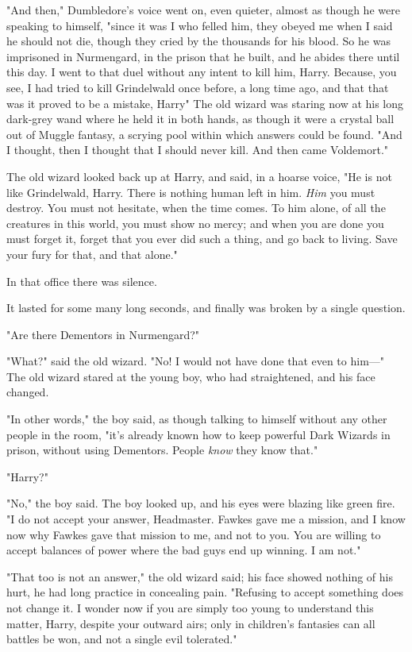 "And then," Dumbledore's voice went on, even quieter, almost as though he were
speaking to himself, "since it was I who felled him, they obeyed me when I said
he should not die, though they cried by the thousands for his blood. So he was
imprisoned in Nurmengard, in the prison that he built, and he abides there
until this day. I went to that duel without any intent to kill him, Harry.
Because, you see, I had tried to kill Grindelwald once before, a long time ago,
and that{\el} that was{\el} it proved to be{\el} a mistake,
Harry{\el}" The old wizard was staring now at his long dark-grey wand where
he held it in both hands, as though it were a crystal ball out of Muggle
fantasy, a scrying pool within which answers could be found. "And I thought,
then{\el} I thought that I should never kill. And then came Voldemort."

The old wizard looked back up at Harry, and said, in a hoarse voice, "He is not
like Grindelwald, Harry. There is nothing human left in him. \emph{Him} you
must destroy. You must not hesitate, when the time comes. To him alone, of all
the creatures in this world, you must show no mercy; and when you are done you
must forget it, forget that you ever did such a thing, and go back to living.
Save your fury for that, and that alone."

In that office there was silence.

It lasted for some many long seconds, and finally was broken by a single
question.

"Are there Dementors in Nurmengard?"

"What?" said the old wizard. "No! I would not have done that even to him---"
\sbreak
The old wizard stared at the young boy, who had straightened, and his face
changed.

"In other words," the boy said, as though talking to himself without any other
people in the room, "it's already known how to keep powerful Dark Wizards in
prison, without using Dementors. People \emph{know} they know that."

"Harry{\el}?"

"No," the boy said. The boy looked up, and his eyes were blazing like green
fire. "I do not accept your answer, Headmaster. Fawkes gave me a mission, and I
know now why Fawkes gave that mission to me, and not to you. You are willing to
accept balances of power where the bad guys end up winning. I am not."

"That too is not an answer," the old wizard said; his face showed nothing of
his hurt, he had long practice in concealing pain. "Refusing to accept
something does not change it. I wonder now if you are simply too young to
understand this matter, Harry, despite your outward airs; only in children's
fantasies can all battles be won, and not a single evil tolerated."

